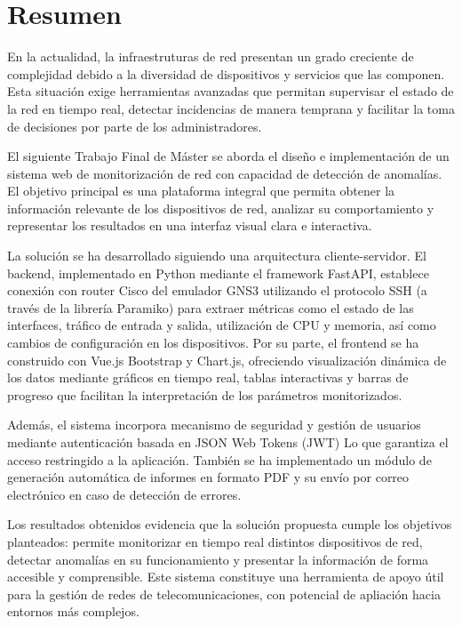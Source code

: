 
\chapter{Resumen}
En la actualidad, la infraestruturas de red presentan un grado creciente de complejidad debido a la diversidad de dispositivos y servicios que las componen. Esta situación exige herramientas avanzadas que permitan supervisar el estado de la red en tiempo real, detectar incidencias de manera temprana y facilitar la toma de decisiones por parte de los administradores.

El siguiente Trabajo Final de Máster se aborda el diseño e implementación de un sistema web de monitorización de red con capacidad de detección de anomalías. El objetivo principal es una plataforma integral que permita obtener la información relevante de los dispositivos de red, analizar su comportamiento y representar los resultados en una interfaz visual clara e interactiva.

La solución se ha desarrollado siguiendo una arquitectura cliente-servidor. El backend, implementado en Python mediante el framework FastAPI, establece conexión con router Cisco del emulador GNS3 utilizando el protocolo SSH (a través de la librería Paramiko) para extraer métricas como el estado de las interfaces, tráfico de entrada y salida, utilización de CPU y memoria, así como cambios de configuración en los dispositivos. Por su parte, el frontend se ha construido con Vue.js Bootstrap y Chart.js, ofreciendo visualización dinámica de los datos mediante gráficos en tiempo real, tablas interactivas y barras de progreso que facilitan la interpretación de los parámetros monitorizados.

Además, el sistema incorpora mecanismo de seguridad y gestión de usuarios mediante autenticación basada en JSON Web Tokens (JWT) Lo que garantiza el acceso restringido a la aplicación. También se ha implementado un módulo de generación automática de informes en formato PDF y su envío por correo electrónico en caso de detección de errores.

Los resultados obtenidos evidencia que la solución propuesta cumple los objetivos planteados: permite monitorizar en tiempo real distintos dispositivos de red, detectar anomalías en su funcionamiento y presentar la información de forma accesible y comprensible. Este sistema constituye una herramienta de apoyo útil para la gestión de redes de telecomunicaciones, con potencial de apliación hacia entornos más complejos.